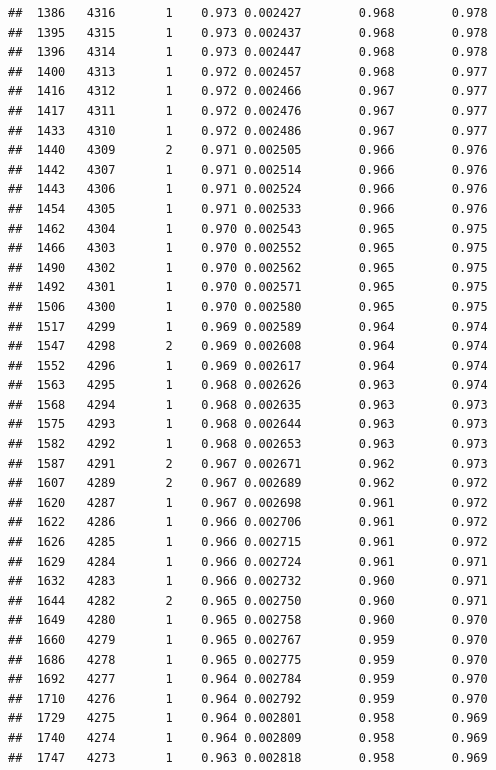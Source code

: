 \documentclass[
]{book}
\begin{document}
\begin{verbatim}
##  1386   4316       1    0.973 0.002427        0.968        0.978
##  1395   4315       1    0.973 0.002437        0.968        0.978
##  1396   4314       1    0.973 0.002447        0.968        0.978
##  1400   4313       1    0.972 0.002457        0.968        0.977
##  1416   4312       1    0.972 0.002466        0.967        0.977
##  1417   4311       1    0.972 0.002476        0.967        0.977
##  1433   4310       1    0.972 0.002486        0.967        0.977
##  1440   4309       2    0.971 0.002505        0.966        0.976
##  1442   4307       1    0.971 0.002514        0.966        0.976
##  1443   4306       1    0.971 0.002524        0.966        0.976
##  1454   4305       1    0.971 0.002533        0.966        0.976
##  1462   4304       1    0.970 0.002543        0.965        0.975
##  1466   4303       1    0.970 0.002552        0.965        0.975
##  1490   4302       1    0.970 0.002562        0.965        0.975
##  1492   4301       1    0.970 0.002571        0.965        0.975
##  1506   4300       1    0.970 0.002580        0.965        0.975
##  1517   4299       1    0.969 0.002589        0.964        0.974
##  1547   4298       2    0.969 0.002608        0.964        0.974
##  1552   4296       1    0.969 0.002617        0.964        0.974
##  1563   4295       1    0.968 0.002626        0.963        0.974
##  1568   4294       1    0.968 0.002635        0.963        0.973
##  1575   4293       1    0.968 0.002644        0.963        0.973
##  1582   4292       1    0.968 0.002653        0.963        0.973
##  1587   4291       2    0.967 0.002671        0.962        0.973
##  1607   4289       2    0.967 0.002689        0.962        0.972
##  1620   4287       1    0.967 0.002698        0.961        0.972
##  1622   4286       1    0.966 0.002706        0.961        0.972
##  1626   4285       1    0.966 0.002715        0.961        0.972
##  1629   4284       1    0.966 0.002724        0.961        0.971
##  1632   4283       1    0.966 0.002732        0.960        0.971
##  1644   4282       2    0.965 0.002750        0.960        0.971
##  1649   4280       1    0.965 0.002758        0.960        0.970
##  1660   4279       1    0.965 0.002767        0.959        0.970
##  1686   4278       1    0.965 0.002775        0.959        0.970
##  1692   4277       1    0.964 0.002784        0.959        0.970
##  1710   4276       1    0.964 0.002792        0.959        0.970
##  1729   4275       1    0.964 0.002801        0.958        0.969
##  1740   4274       1    0.964 0.002809        0.958        0.969
##  1747   4273       1    0.963 0.002818        0.958        0.969

\end{verbatim}
\end{document}
